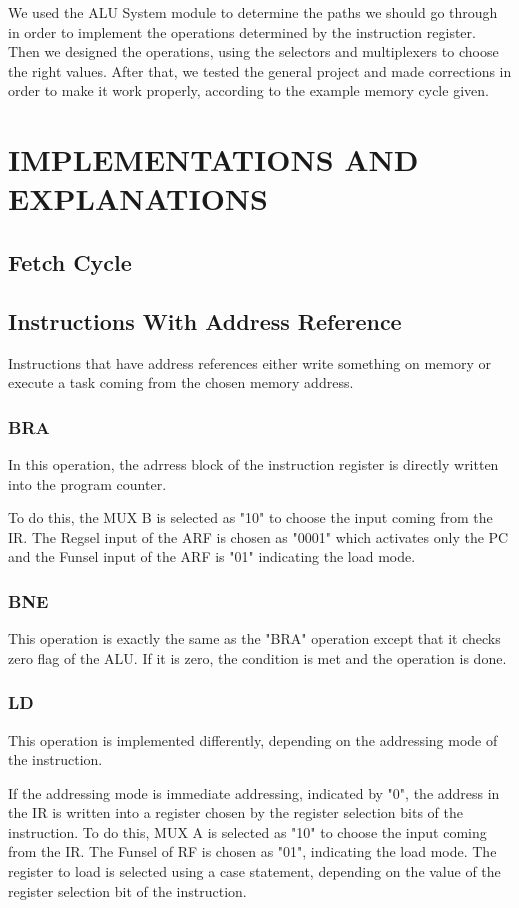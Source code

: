 \documentclass[pdftex,12pt,a4paper]{article}
\begin{document}
We used the ALU System module to determine the paths we should go through in order to implement the operations 
determined by the instruction register. Then we designed the operations, using the selectors and multiplexers to choose
the right values. After that, we tested the general project and made corrections in order to make it work properly, 
according to the example memory cycle given. 

\section{IMPLEMENTATIONS AND EXPLANATIONS }
\subsection{Fetch Cycle}

\subsection{Instructions With Address Reference}
Instructions that have address references either write something on memory or execute a task coming from the chosen 
memory address. 

\subsubsection{BRA}
In this operation, the adrress block of the instruction register is directly written into the program counter.

To do this, the MUX B is selected as "10" to choose the input coming from the IR. The Regsel 
input of the ARF is chosen as "0001" which activates only the PC and the Funsel input of the ARF is "01" indicating
the load mode.

\subsubsection{BNE}
This operation is exactly the same as the "BRA" operation except that it checks zero flag of the ALU. If it is zero,
the condition is met and the operation is done.

\subsubsection{LD}
This operation is implemented differently, depending on the addressing mode of the instruction.

If the addressing mode is immediate addressing, indicated by "0", the address in the IR is written into a register
chosen by the register selection bits of the instruction. To do this, MUX A is selected as "10" to choose the input 
coming from the IR. The Funsel of RF is chosen as "01", indicating the load mode. The register to load is selected 
using a case statement, depending on the value of the register selection bit of the instruction.
\end{document}
